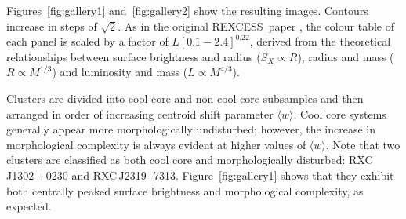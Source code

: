 \documentclass[oldversion]{aa}
\newcommand{\rexcess}{{\gwpfont REXCESS}}
\begin{document}
Figures~\ref{fig:gallery1} and~\ref{fig:gallery2} show the resulting images. Contours increase in steps of $\sqrt{2}$. As in the original \rexcess\ paper \citep{boehringer07}, the colour table of each panel is scaled by a factor of $L [0.1-2.4]^{0.22}$, derived from the theoretical relationships between surface brightness and radius ($S_X \propto R$), radius and mass ($R \propto M^{1/3}$) and luminosity and mass ($L \propto M^{4/3}$). 

Clusters are divided into cool core and non cool core subsamples and then arranged in order of increasing centroid shift parameter $\langle w \rangle$.  Cool core systems generally appear more morphologically undisturbed; however, the increase in morphological complexity is always evident at higher values of $\langle w \rangle$. Note that two clusters are classified as both cool core and morphologically disturbed: RXC\,J1302 +0230 and RXC\,J2319 -7313. Figure~\ref{fig:gallery1} shows that they exhibit both centrally peaked surface brightness and morphological complexity, as expected.
\end{document}
